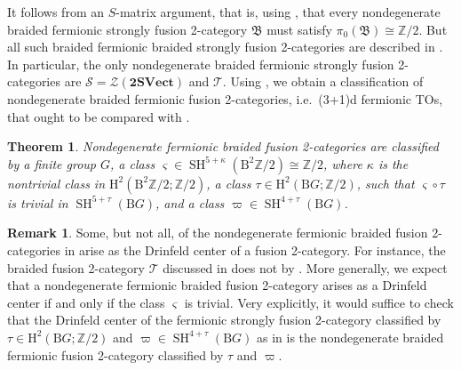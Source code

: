\documentclass[11pt,reqno]{amsart}
\newcommand{\Z}{\mathbb{Z}}
\DeclareMathOperator{\SH}{SH}
\newcommand{\rH}{\mathrm{H}}
\newcommand{\rB}{\mathrm{B}}
\numberwithin{equation}{section}
\theoremstyle{plain}
\newtheorem{thm}[equation]{Theorem}
\theoremstyle{definition}
\newtheorem{rem}[equation]{Remark}
\begin{document}
It follows from an $S$-matrix argument, that is, using \cite[Theorem 2.57]{JFR}, that every nondegenerate braided fermionic strongly fusion 2-category $\mathfrak{B}$ must satisfy $\pi_0(\mathfrak{B})\cong\mathbb{Z}/2$. But all such braided fermionic braided strongly fusion 2-categories are described in .
In particular, the only nondegenerate braided fermionic strongly fusion 2-categories are $\mathcal S = \mathcal{Z}(\mathbf{2SVect})$ and $\mathcal T$. Using , we obtain a classification of nondegenerate braided fermionic fusion 2-categories, i.e.\ (3+1)d fermionic TOs, that ought to be compared with \cite[Corollary V.5]{JF}.

\begin{thm}\label{FermionicNondegen}
   Nondegenerate fermionic braided fusion 2-categories are classified by a finite group $G$, a class $\varsigma \in \SH^{5+\kappa}(\rB^2 \Z/2)\cong\mathbb{Z}/2$, where $\kappa$ is the nontrivial class in $\rH^2(\rB^2 \Z/2;\Z/2)$, a class $\tau\in \rH^2(\rB G;\Z/2)$, such that $\varsigma \circ \tau$ is trivial in $\SH^{5+\tau}(\rB G)$, and a class $\varpi \in \SH^{4+\tau}(\rB G)$.
\end{thm}

\begin{rem}\label{rem:fermioniccenters}
Some, but not all, of the nondegenerate fermionic braided fusion 2-categories in  arise as the Drinfeld center of a fusion 2-category. For instance, the braided fusion 2-category $\mathcal{T}$ discussed in  does not by \cite{JFR,D9}. More generally, we expect that a nondegenerate fermionic braided fusion 2-category arises as a Drinfeld center if and only if the class $\varsigma$ is trivial.
Very explicitly, it would suffice to check that the Drinfeld center of the fermionic strongly fusion 2-category classified by $\tau\in \rH^2(\rB G;\Z/2)$ and $\varpi \in \SH^{4+\tau}(\rB G)$ as in \cite[Theorem 4.5]{D11} is the nondegenerate braided fermionic fusion 2-category classified by $\tau$ and $\varpi$.
\end{rem}
\end{document}
